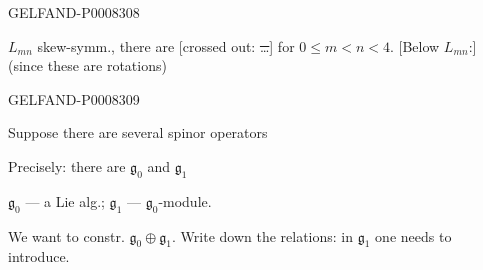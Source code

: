 \begin{GelfandAdjacentEvidence}{GELFAND-P000830}{8}


\(L_{mn}\) skew-symm., there are [crossed out: \sout{…}]
for \(0\le m<n<4\).
[Below \(L_{mn}\):] (since these are rotations)
\end{GelfandAdjacentEvidence}
\begin{GelfandAdjacentEvidence}{GELFAND-P000830}{9}


\end{GelfandAdjacentEvidence}


Suppose there are several spinor operators

Precisely: there are \(\mathfrak g_0\) and \(\mathfrak g_1\)

\(\mathfrak g_0\) — a Lie alg.; \(\mathfrak g_1\) — \(\mathfrak g_0\)-module.

We want to constr. \(\mathfrak g_0\oplus\mathfrak g_1\).
Write down the relations: in \(\mathfrak g_1\) one needs to introduce.



